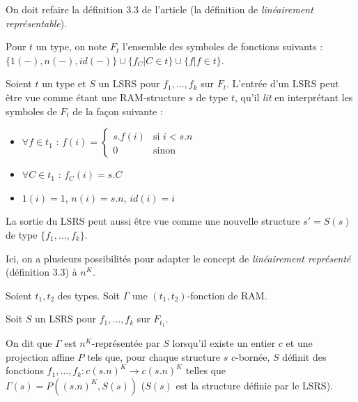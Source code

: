 		
		On doit refaire la définition 3.3 de l'article (la définition de \emph{linéairement représentable}).
		
		Pour $t$ un type, on note $F_t$ l'ensemble des symboles de fonctions suivants : $\{1(-), n(-), id(-)\} \cup  \{ f_C | C \in t\} \cup \{ f | f \in t\}$.
		
		\begin{remark}
			\label{rk:entree_LSRS}
			Soient $t$ un type et $S$ un LSRS pour $f_1, \dots, f_k$ sur $F_{t}$. 
			L'entrée d'un LSRS peut être vue comme étant une RAM-structure $s$ de type $t$, qu'il \emph{lit} en interprétant les symboles de $F_t$ de la façon suivante : 
			
			\begin{itemize}[itemsep=-1mm]
				\item 	$\forall f \in t_1$ :   $f(i) = 
				\left\lbrace \begin{array}{ll}
				s.f(i) & \text{si } i< s.n \\
				0 & \text{sinon}
				\end{array}\right.$
				
				\item 	$\forall C \in t_1$ :   $f_C(i) = s.C$
				\item 	$1(i) = 1$, $n(i) = s.n$, $id(i) = i$
			\end{itemize}
			
			La sortie du LSRS peut aussi être vue comme une nouvelle structure $s' = S(s)$ de type $\{f_1, \dots, f_k\}$.
		\end{remark}
		
		
		Ici, on a plusieurs possibilités pour adapter le concept de \emph{linéairement représenté} (définition 3.3) à $n^K$.
		
		\begin{definition}
			\label{def:representee_par_LSRS}
			Soient $t_1, t_2$ des types. Soit $\Gamma$ une $(t_1, t_2)$-fonction de RAM.
			
			
			Soit $S$ un LSRS pour $f_1, \dots, f_k$ sur $F_{t_1}$. 
			
			On dit que $\Gamma$ est $n^K$-représentée par $S$ lorsqu'il existe un entier $c$ et une projection affine $P$ tels que, pour chaque structure $s$ $c$-bornée, $S$ définit des fonctions $f_1, \dots, f_k : c (s.n)^K \to c (s.n)^K$ telles que $\Gamma(s) = P((s.n)^K, S(s))$ ($S(s)$ est la structure définie par le LSRS).
			

		\end{definition}
		
